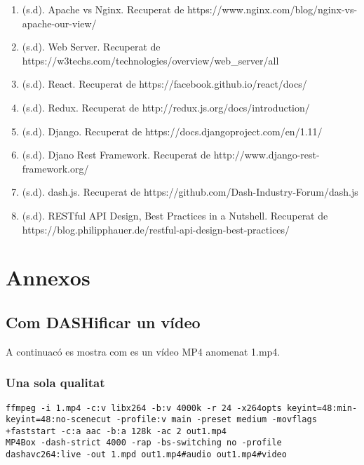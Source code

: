 \documentclass[12pt, titlepage]{article}
\begin{document}
\begin{enumerate}
\item (s.d). Apache vs Nginx. Recuperat de https://www.nginx.com/blog/nginx-vs-apache-our-view/

\item (s.d). Web Server. Recuperat de \\ https://w3techs.com/technologies/overview/web\_server/all

\item (s.d). React. Recuperat de https://facebook.github.io/react/docs/

\item (s.d). Redux. Recuperat de http://redux.js.org/docs/introduction/

\item (s.d). Django. Recuperat de https://docs.djangoproject.com/en/1.11/

\item (s.d). Djano Rest Framework. Recuperat de http://www.django-rest-framework.org/

\item (s.d). dash.js. Recuperat de https://github.com/Dash-Industry-Forum/dash.js

\item (s.d). RESTful API Design, Best Practices in a Nutshell. Recuperat de https://blog.philipphauer.de/restful-api-design-best-practices/

\end{enumerate}

\section{Annexos}

\subsection{Com DASHificar un vídeo}

A continuacó es mostra com es  un vídeo MP4 anomenat 1.mp4.

\subsubsection{Una sola qualitat}

\begin{lstlisting}[breaklines]
ffmpeg -i 1.mp4 -c:v libx264 -b:v 4000k -r 24 -x264opts keyint=48:min-keyint=48:no-scenecut -profile:v main -preset medium -movflags +faststart -c:a aac -b:a 128k -ac 2 out1.mp4
MP4Box -dash-strict 4000 -rap -bs-switching no -profile dashavc264:live -out 1.mpd out1.mp4#audio out1.mp4#video
\end{lstlisting}
\end{document}
